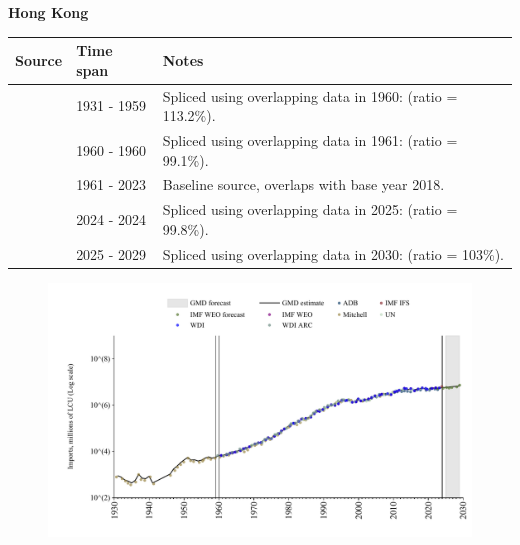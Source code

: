 \documentclass[12pt,a4paper,landscape]{article}
\begin{document}
\begin{adjustbox}{max totalsize={\paperwidth}{\paperheight},center}
\begin{minipage}[t][\textheight][t]{\textwidth}
\vspace*{0.5cm}
{}
\begin{center}
{\Large\bfseries Hong Kong}
\end{center}
\vspace{0.5cm}
\begin{table}[H]
\centering
\small
\begin{tabular}{|l|l|l|}
\hline
\textbf{Source} & \textbf{Time span} & \textbf{Notes} \\
\hline
\rowcolor{white}\cite{Mitchell}& 1931 - 1959 &Spliced using overlapping data in 1960: (ratio = 113.2\%).\\
\rowcolor{lightgray}\cite{WDI_ARC}& 1960 - 1960 &Spliced using overlapping data in 1961: (ratio = 99.1\%).\\
\rowcolor{white}\cite{WDI}& 1961 - 2023 &Baseline source, overlaps with base year 2018.\\
\rowcolor{lightgray}\cite{IMF_IFS}& 2024 - 2024 &Spliced using overlapping data in 2025: (ratio = 99.8\%).\\
\rowcolor{white}\cite{IMF_WEO_forecast}& 2025 - 2029 &Spliced using overlapping data in 2030: (ratio = 103\%).\\
\hline
\end{tabular}
\end{table}
\begin{figure}[H]
\centering
\includegraphics[width=\textwidth,height=0.6\textheight,keepaspectratio]{graphs/HKG_imports.pdf}
\end{figure}
\end{minipage}
\end{adjustbox}
\end{document}
